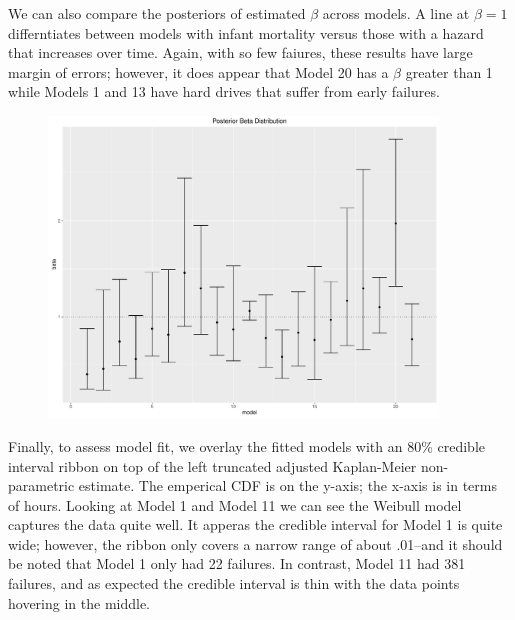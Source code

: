 \documentclass{scrartcl}
\begin{document}
\noindent We can also compare the posteriors of estimated $\beta$ across models.  A line at $\beta=1$ differntiates between models with infant mortality versus those with a hazard that increases over time.  Again, with so few faiures, these results have large margin of errors; however, it does appear that Model 20 has a $\beta$ greater than 1 while Models 1 and 13 have hard drives that suffer from early failures.
\begin{figure}[H]
\centering
\includegraphics[height=8cm]{postbeta.pdf}
\end{figure}

\noindent Finally, to assess model fit, we overlay the fitted models with an 80\% credible interval ribbon on top of the left truncated adjusted Kaplan-Meier non-parametric estimate.  The emperical CDF is on the y-axis; the x-axis is in terms of hours.  Looking at Model 1 and Model 11 we can see the Weibull model captures the data quite well.  It apperas the credible interval for Model 1 is quite wide; however, the ribbon only covers a narrow range of about .01--and it should be noted that Model 1 only had 22 failures.  In contrast, Model 11 had 381 failures, and as expected the credible interval is thin with the data points hovering in the middle.
\end{document}
